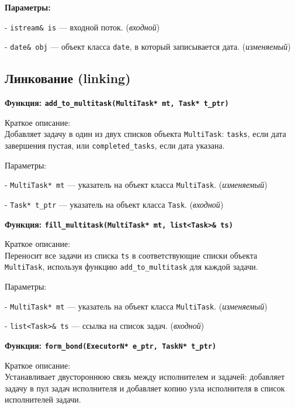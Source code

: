 \documentclass[12pt,a4paper]{extarticle}
\begin{document}
\textbf{Параметры:}


- \texttt{istream\& is} — входной поток. (\textit{входной})

- \texttt{date\& obj} — объект класса \texttt{date}, в который записывается дата. (\textit{изменяемый})



\subsection{Линкование (linking)}
\begin{center}
    \textbf{Функция: \texttt{add\_to\_multitask(MultiTask* mt, Task* t\_ptr)}}

\end{center}

Краткое описание: \\
Добавляет задачу в один из двух списков объекта \texttt{MultiTask}: \texttt{tasks}, если дата завершения пустая, или \texttt{completed\_tasks}, если дата указана.

Параметры:


- \texttt{MultiTask* mt} — указатель на объект класса \texttt{MultiTask}. (\textit{изменяемый})

- \texttt{Task* t\_ptr} — указатель на объект класса \texttt{Task}. (\textit{входной})

\begin{center}
    \textbf{Функция: \texttt{fill\_multitask(MultiTask* mt, list<Task>\& ts)}}

\end{center}

Краткое описание: \\
Переносит все задачи из списка \texttt{ts} в соответствующие списки объекта \texttt{MultiTask}, используя функцию \texttt{add\_to\_multitask} для каждой задачи.

Параметры:


- \texttt{MultiTask* mt} — указатель на объект класса \texttt{MultiTask}. (\textit{изменяемый})

- \texttt{list<Task>\& ts} — ссылка на список задач. (\textit{входной})

\begin{center}
    \textbf{Функция: \texttt{form\_bond(ExecutorN* e\_ptr, TaskN* t\_ptr)}}

\end{center}

Краткое описание: \\
Устанавливает двустороннюю связь между исполнителем и задачей: добавляет задачу в пул задач исполнителя и добавляет копию узла исполнителя в список исполнителей задачи.
\end{document}
